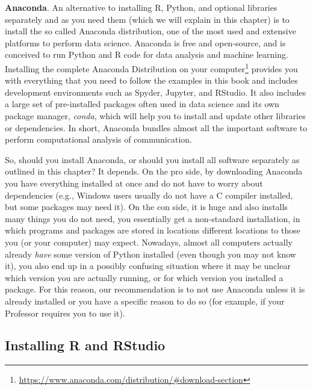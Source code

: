 \begin{feature}\textbf{Anaconda}. An alternative to installing 
  R, Python, and optional libraries separately and as you need them
  (which we will explain in this chapter) is to install the so called
  Anaconda distribution, one of the most used and extensive platforms
  to perform data science. Anaconda is free and open-source, and is
  conceived to run Python and R code for data analysis and machine
  learning. Installing the complete Anaconda Distribution on your
  computer\footnote{\url{https://www.anaconda.com/distribution/\#download-section}}
  provides you with everything that you need to follow the examples in
  this book and includes development environments such as Spyder,
  Jupyter, and RStudio. It also includes a large set of pre-installed
  packages often used in data science and its own package manager,
  \emph{conda}, which will help you to install and update other
  libraries or dependencies. In short, Anaconda bundles  almost all the 
  important software to perform computational analysis of
  communication.

  So, should you install Anaconda, or should you
  install all software separately as outlined in this chapter? It
  depends. On the pro side, by downloading Anaconda you have everything installed at once and do
  not have to worry about dependencies (e.g., Windows users usually
  do not have a C compiler installed, but some packages may need
  it). On the con side,  it is huge and also installs many
  things you do not need, you essentially get a non-standard
  installation, in which programs and packages are stored in locations different
  locations to those you (or your computer) may expect. Nowadays, almost all computers
  actually already \emph{have} some version of Python installed (even though you may
  not know it), you also end up in a possibly confusing situation
  where it may be unclear which version you are actually running, or
  for which version you installed a package.
  For this reason, our recommendation is to not use Anaconda unless
  it is already installed or you have a specific reason to do so
  (for example, if your Professor requires you to use it).
\end{feature}

\subsection{Installing R and RStudio}\label{sec:installr}

